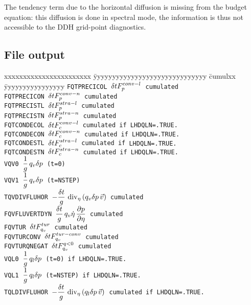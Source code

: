 \noi The tendency term due to the horizontal diffusion is missing from the budget equation: this diffusion is done in spectral mode, the information is thus not accessible to the DDH grid-point diagnostics.

\subsection*{File output}
\begin{tabbing}
xxxxxxxxxxxxxxxxxxxxxxx \= yyyyyyyyyyyyyyyyyyyyyyyyyyyyyy \= cumulxx \= yyyyyyyyyyyyyyyy \kill
\tt FQTPRECICOL \> $\displaystyle \delta t F_{p}^{conv-l}$ \> cumulated \> \\
\tt FQTPRECICON \> $\displaystyle \delta t F_{p}^{conv-n}$ \> cumulated \> \\
\tt FQTPRECISTL \> $\displaystyle \delta t F_{p}^{stra-l}$ \> cumulated \> \\
\tt FQTPRECISTN \> $\displaystyle \delta t F_{p}^{stra-n}$ \> cumulated \> \\
\tt FQTCONDECOL \> $\displaystyle \delta t F_{c}^{conv-l}$ \> cumulated \> if {\tt LHDQLN=.TRUE.} \\
\tt FQTCONDECON \> $\displaystyle \delta t F_{c}^{conv-n}$ \> cumulated \> if {\tt LHDQLN=.TRUE.} \\
\tt FQTCONDESTL \> $\displaystyle \delta t F_{c}^{stra-l}$ \> cumulated \> if {\tt LHDQLN=.TRUE.} \\
\tt FQTCONDESTN \> $\displaystyle \delta t F_{c}^{stra-n}$ \> cumulated \> if {\tt LHDQLN=.TRUE.} \\
\tt VQV0 \> $ \displaystyle\frac 1g\,q_v \delta p$ (t=0) \> \\[1ex]
\tt VQV1 \> $ \displaystyle\frac 1g\,q_v \delta p$ (t=NSTEP) \> \\[1ex]
\tt TQVDIVFLUHOR \> $\displaystyle - \frac{\delta t}g \,\mathop{\rm div}\nolimits_{\eta} \left( q_v \delta p \,\vec v \right)$ \> cumulated \> \\[1ex]
\tt FQVFLUVERTDYN \> $\displaystyle\frac{\delta t}g \,q_v\dot\eta\,\frac{\displaystyle \partial p}{\displaystyle \partial \eta}$ \> cumulated \> \\[1ex]
\tt FQVTUR \> $\displaystyle\delta t F_{q_v}^{tur}$ \> cumulated \> \\
\tt FQVTURCONV \> $\displaystyle \delta t F_{q_v}^{tur-conv}$ \> cumulated \> \\
\tt FQVTURQNEGAT \> $\displaystyle \delta t F_{q_v}^{q<0}$ \> cumulated \> \\
\tt VQL0 \> $ \displaystyle\frac 1g\,q_l \delta p$ (t=0) \> \> if {\tt LHDQLN=.TRUE.} \\[1ex]
\tt VQL1 \> $ \displaystyle\frac 1g\,q_l \delta p$ (t=NSTEP) \> \> if {\tt LHDQLN=.TRUE.} \\[1ex]
\tt TQLDIVFLUHOR \> $\displaystyle - \frac{\delta t}g \,\mathop{\rm div}\nolimits_{\eta} \left( q_l \delta p \,\vec v \right)$ \> cumulated \> if {\tt LHDQLN=.TRUE.}\\[1ex]

\end{tabbing}
